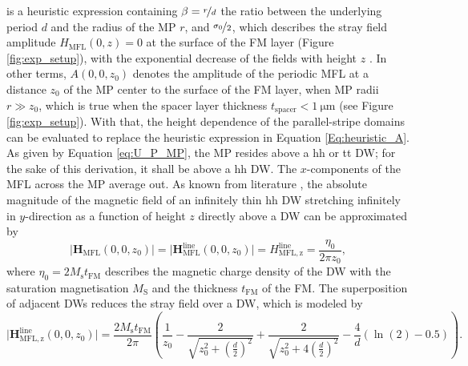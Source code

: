 is a heuristic expression containing $\beta = \nicefrac{r}{d}$ the ratio between the underlying period $d$ and the radius of the \ac{MP} $r$, and $\nicefrac{\sigma_0}{2}$, which describes the stray field amplitude $H_\mathrm{MFL}(0,z)=0$ at the surface of the \ac{FM} layer (Figure \ref{fig:exp_setup}), with the exponential decrease of the fields with height $z$ \cite{Yellen2007, Ehresmann2026}.  
In other terms, $A(0,0,z_0)$ denotes the amplitude of the periodic \ac{MFL} at a distance $z_0$ of the \ac{MP} center to the surface of the \ac{FM} layer, when \ac{MP} radii $r\gg z_0$, which is true when the spacer layer thickness $t_\mathrm{spacer}< \SI{1}{\micro\m}$ (see Figure \ref{fig:exp_setup}).
With that, the height dependence of the parallel-stripe domains can be evaluated to replace the heuristic expression in Equation \ref{Eq:heuristic_A}.
As given by Equation \ref{eq:U_P_MP}, the \ac{MP} resides above a \ac{hh} or \ac{tt} \ac{DW}; for the sake of this derivation, it shall be above a \ac{hh} \ac{DW}.
The $x$-components of the \ac{MFL} across the \ac{MP} average out\cite{Ehresmann2026}.
As known from literature \cite{Zingsem2017}, the absolute magnitude of the magnetic field of an infinitely thin \ac{hh} \ac{DW} stretching infinitely in $y$-direction as a function of height $z$ directly above a \ac{DW} can be approximated by
\begin{equation}
    \lvert \mathbf{H}_\mathrm{MFL}(0,0,z_0) \rvert = \lvert \mathbf{H}_\mathrm{MFL}^\mathrm{line}(0,0,z_0) \rvert = H_\mathrm{MFL, z}^\mathrm{line} = \frac{\eta_0}{2\pi z_0},
\end{equation}
where $\eta_0 = 2M_\mathrm{s}t_\mathrm{FM}$ describes the magnetic charge density of the \ac{DW} with the saturation magnetisation $M_\mathrm{S}$ and the thickness $t_\mathrm{FM}$ of the \ac{FM}. 
The superposition of adjacent \acp{DW} reduces the stray field over a \ac{DW}, which is modeled by\cite{Ehresmann2026}
\begin{equation}\label{eq:fields_of_adjecent_DW}
    \lvert \mathbf{H}_\mathrm{MFL, z}^\mathrm{line}(0,0,z_0) \rvert = \frac{2M_\mathrm{s}t_\mathrm{FM}}{2\pi}\left(\frac{1}{z_0}-\frac{2}{\sqrt{z^2_0 +\left( \frac{d}{2}\right)^2}}+\frac{2}{{\sqrt{z^2_0 +4\left( \frac{d}{2}\right)^2}}} - \frac{4}{d} (\ln(2) - 0.5)\right).
\end{equation}


